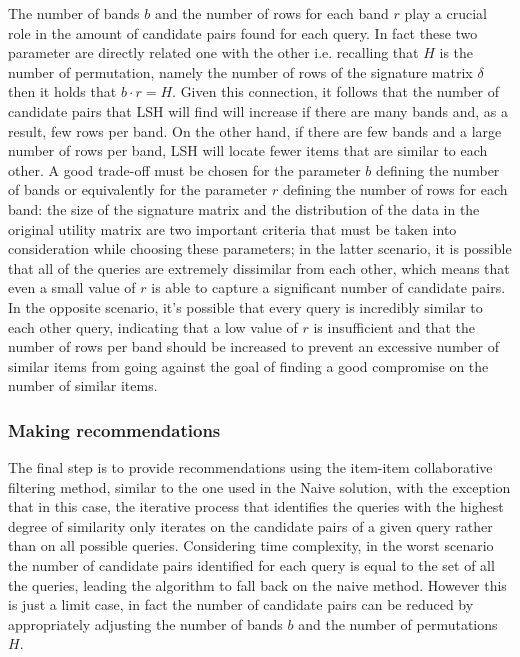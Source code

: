 The number of bands $b$ and the number of rows for each band $r$ play a crucial role in the amount of candidate pairs found for each query. In fact these two parameter are directly related one with the other i.e. recalling that $H$ is the number of permutation, namely the number of rows of the signature matrix $\delta$ then it holds that $b \cdot r = H$. Given this connection, it follows that the number of candidate pairs that LSH will find will increase if there are many bands and, as a result, few rows per band. On the other hand, if there are few bands and a large number of rows per band, LSH will locate fewer items that are similar to each other. A good trade-off must be chosen for the parameter $b$ defining the number of bands or equivalently for the parameter $r$ defining the number of rows for each band: the size of the signature matrix and the distribution of the data in the original utility matrix are two important criteria that must be taken into consideration while choosing these parameters; in the latter scenario, it is possible that all of the queries are extremely dissimilar from each other, which means that even a small value of $r$ is able to capture a significant number of candidate pairs. In the opposite scenario, it's possible that every query is incredibly similar to each other query, indicating that a low value of $r$ is insufficient and that the number of rows per band should be increased to prevent an excessive number of similar items from going against the goal of finding a good compromise on the number of similar items. 



\subsubsection{Making recommendations} \label{making_rec}
The final step is to provide recommendations using the item-item collaborative filtering method, similar to the one used in the Naive solution, with the exception that in this case, the iterative process that identifies the queries with the highest degree of similarity only iterates on the candidate pairs of a given query rather than on all possible queries. Considering time complexity, in the worst scenario the number of candidate pairs identified for each query is equal to the set of all the queries, leading the algorithm to fall back on the naive method. However this is just a limit case, in fact the number of candidate pairs can be reduced by appropriately adjusting the number of bands $b$ and the number of permutations $H$. 


